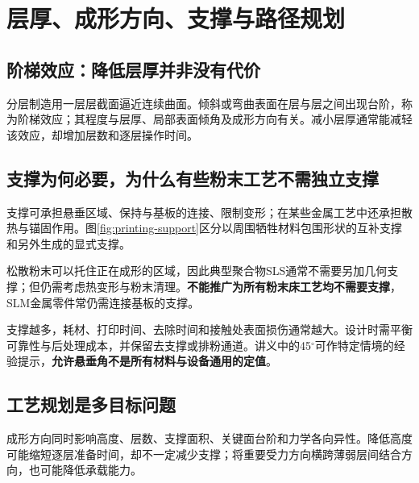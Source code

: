 \section{层厚、成形方向、支撑与路径规划}
\subsection{阶梯效应：降低层厚并非没有代价}
分层制造用一层层截面逼近连续曲面。倾斜或弯曲表面在层与层之间出现台阶，称为阶梯效应；其程度与层厚、局部表面倾角及成形方向有关。减小层厚通常能减轻该效应，却增加层数和逐层操作时间。


\subsection{支撑为何必要，为什么有些粉末工艺不需独立支撑}
支撑可承担悬垂区域、保持与基板的连接、限制变形；在某些金属工艺中还承担散热与锚固作用。图\ref{fig:printing-support}区分以周围牺牲材料包围形状的互补支撑和另外生成的显式支撑。

松散粉末可以托住正在成形的区域，因此典型聚合物SLS通常不需要另加几何支撑；但仍需考虑热变形与粉末清理。\textbf{不能推广为所有粉末床工艺均不需要支撑}，SLM金属零件常仍需连接基板的支撑。

支撑越多，耗材、打印时间、去除时间和接触处表面损伤通常越大。设计时需平衡可靠性与后处理成本，并保留去支撑或排粉通道。讲义中的45$^\circ$可作特定情境的经验提示，\textbf{允许悬垂角不是所有材料与设备通用的定值}。

\subsection{工艺规划是多目标问题}
成形方向同时影响高度、层数、支撑面积、关键面台阶和力学各向异性。降低高度可能缩短逐层准备时间，却不一定减少支撑；将重要受力方向横跨薄弱层间结合方向，也可能降低承载能力。

